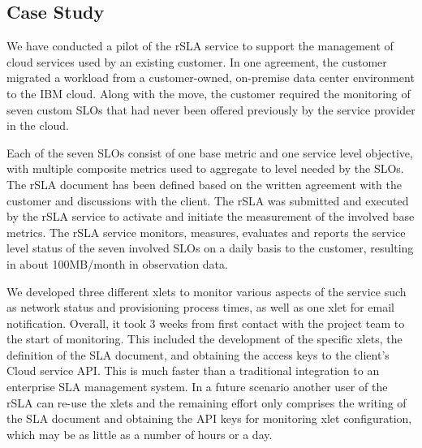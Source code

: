 \subsection{Case Study}

We have conducted a pilot of the rSLA service to support the management of cloud services used by an existing customer. In one agreement, the  customer migrated a workload from a customer-owned, on-premise data center environment to the IBM cloud.  Along with the move, the customer required the monitoring of seven custom SLOs that had never been offered previously by the service provider in the cloud.

Each of the seven  SLOs consist of one base metric and one service level objective, with multiple composite metrics used to aggregate to level needed by the SLOs. The rSLA document has been defined based on the written agreement with the customer and discussions with the client. The rSLA was submitted and  executed by the rSLA service to activate and initiate the measurement of the involved base metrics. The rSLA service monitors, measures, evaluates and reports the service level status of the seven involved SLOs on a daily basis to the customer, resulting in about 100MB/month in observation data.

We developed three different xlets to monitor various aspects of the service such as network status and provisioning process times, as well as one xlet for email notification. Overall, it took 3 weeks from first contact with the project team to the start of monitoring. This included the development of the specific xlets, the definition of the SLA document, and obtaining the access keys to the client's Cloud service API. This is much faster than a traditional integration to an enterprise SLA management system. In a future scenario another user of the rSLA can re-use the xlets and the remaining effort only comprises the writing of the SLA document and obtaining the API keys for monitoring xlet configuration, which may be as little as a number of hours or a day.




